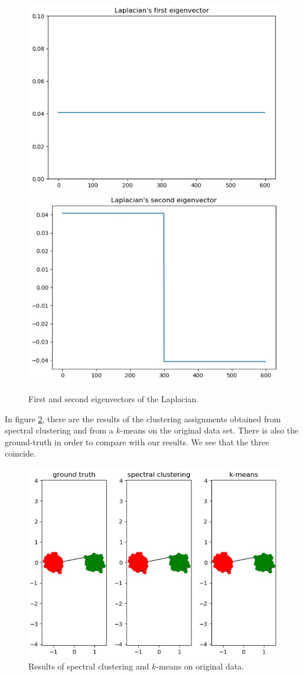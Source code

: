 \documentclass[a4paper, 11pt]{article}
\begin{document}
    \begin{figure}[!ht]
        \centering
        \includegraphics[width=.48\textwidth]{images/two_blobs_21_first_eigenvector.jpg}
        \hfill
        \includegraphics[width=.48\textwidth]{images/two_blobs_21_second_eigenvector.jpg}
        \caption{First and second eigenvectors of the Laplacian.}
        \label{fig:two-blobs-21-eigenvectors}
    \end{figure}

    In figure \ref{fig:question-21-results}, there are the results of the clustering assignments obtained from spectral clustering and from a $k$-means on the original data set. There is also the ground-truth in order to compare with our results. We see that the three coincide.
    
    \begin{figure}[!ht]
        \centering
        \includegraphics[width=.5\textwidth]{images/question_21_results.jpg}
        \caption{Results of spectral clustering and $k$-means on original data.}
        \label{fig:question-21-results}
    \end{figure}
    
\end{document}
